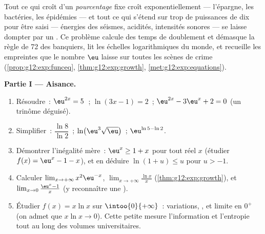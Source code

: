\begin{problem}
\label{pb:g12:exp:1}
Tout ce qui croît d'un \emph{pourcentage} fixe croît
exponentiellement --- l'épargne, les bactéries, les épidémies ---
et tout ce qui s'étend sur trop de puissances de dix pour être saisi
--- énergies des séismes, acidités, intensités sonores --- se
laisse dompter par un . Ce problème calcule des temps de
doublement et démasque la règle de 72 des banquiers, lit les
échelles logarithmiques du monde, et recueille les empreintes que le
nombre $\eu$ laisse sur toutes les scènes de crime
(\cref{prop:g12:exp:funceq}, \cref{thm:g12:exp:growth},
\cref{met:g12:exp:equations}).

\medskip
\noindent\textbf{Partie I --- Aisance.}
\begin{enumerate}
  \item Résoudre~: $\eu^{2x} = 5$~; \quad $\ln(3x - 1) = 2$~; \quad
        $\eu^{2x} - 3\eu^x + 2 = 0$ (un trinôme déguisé).
  \item Simplifier~: $\dfrac{\ln 8}{\ln 2}$~; \quad
        $\ln\!\left(\eu^3 \sqrt{\eu}\right)$~; \quad
        $\eu^{\ln 5 - \ln 2}$.
  \item Démontrer l'inégalité mère~: $\eu^x \geq 1 + x$ pour tout
        réel $x$ (étudier $f(x) = \eu^x - 1 - x$), et en déduire
        $\ln(1 + u) \leq u$ pour $u > -1$.
  \item Calculer $\lim_{x \to +\infty} x^2 \eu^{-x}$,
        $\lim_{x \to +\infty} \frac{\ln x}{x}$
        (\cref{thm:g12:exp:growth}), et
        $\lim_{x \to 0} \frac{\eu^x - 1}{x}$ (y reconnaître une
        ).
  \item Étudier $f(x) = x \ln x$ sur $\intoo{0}{+\infty}$~:
        variations, , et limite en $0^+$ (on admet que
        $x \ln x \to 0$). Cette petite  mesure l'information
        et l'entropie tout au long des volumes universitaires.
\end{enumerate}


\end{problem}
